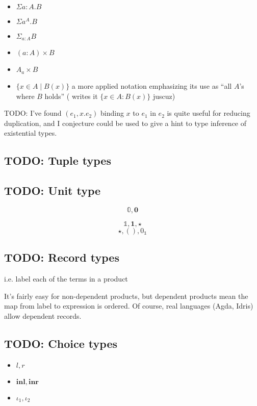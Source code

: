 \documentclass[11pt]{article} %
\theoremstyle{definition}
\theoremstyle{remark}
\begin{document}
\begin{itemize}
  \item $\Sigma a:A. B$
  \item $\Sigma a^A. B$
  \item $\Sigma_{a:A}B$
  \item $(a:A) \times B$
  \item $A \mathbin{_a{\times}} B$
  \item $\{x \in A \mid B(x) \}$ a more applied notation emphasizing its use as ``all $A$'s where $B$ holds'' (\cite{martin-lof_1984} writes it $\{x \in A : B(x) \}$ juscuz)
\end{itemize}

TODO: I've found $(e_1, x.e_2)$ binding $x$ to $e_1$ in $e_2$ is quite useful for reducing duplication, and I conjecture could be used to give a hint to type inference of existential types.


\subsection{TODO: Tuple types}

\subsection{TODO: Unit type}
\label{subsec:unit-type}

$$\mathbb 0, \mathbf 0$$

$$\mathbb 1, \mathbf 1, \star$$
$$\star, (), 0_\mathbb 1$$

\subsection{TODO: Record types}
i.e. label each of the terms in a product

It's fairly easy for non-dependent products, but dependent products mean the map from label to expression is ordered.
Of course, real languages (Agda, Idris) allow dependent records.


\subsection{TODO: Choice types}
\label{subsec:choice-types}

\begin{itemize}
  \item $l, r$
  \item $\mathbf{inl}, \mathbf{inr}$
  \item $\iota_1, \iota_2$
\end{itemize}
\end{document}
